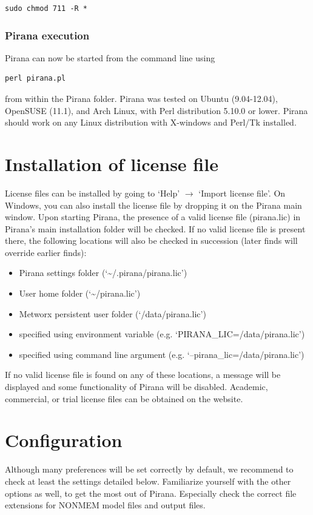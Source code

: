 \begin{lstlisting}
sudo chmod 711 -R *
\end{lstlisting}

\subsubsection*{Pirana execution}
\noindent Pirana can now be started from the command line using

\begin{lstlisting}
perl pirana.pl
\end{lstlisting}

\noindent from within the Pirana folder. Pirana was tested on Ubuntu
(9.04-12.04), OpenSUSE (11.1), and Arch Linux, with Perl
distribution 5.10.0 or lower. Pirana should work on any Linux distribution
with X-windows and Perl/Tk installed.

\section{Installation of license file} License files can be installed by going to `Help' $\rightarrow$ `Import license file'. On Windows, you can also install the license file by dropping it on the Pirana main window.
Upon starting Pirana, the presence of a valid license file (pirana.lic) in Pirana's main installation folder will be checked.
If no valid license file is present there, the following locations will also be checked in succession (later finds will override earlier finds):

\begin{itemize}
  \item Pirana settings folder (`\~{}/.pirana/pirana.lic')
  \item User home folder (`\~{}/pirana.lic')
  \item Metworx persistent user folder (`/data/pirana.lic')
  \item specified using environment variable (e.g. `PIRANA\_LIC=/data/pirana.lic')
  \item specified using command line argument (e.g. `--pirana\_lic=/data/pirana.lic')
\end{itemize}

If no valid license file is found on any of these locations, a message will be displayed and some functionality of Pirana will be
disabled. Academic, commercial, or trial license files can be obtained on the website.

\section{Configuration} Although many preferences will
be set correctly by default, we recommend to check at least the
settings detailed below. Familiarize yourself with
the other options as well, to get the most out of Pirana. Especially check the correct file extensions
for NONMEM model files and output files.

